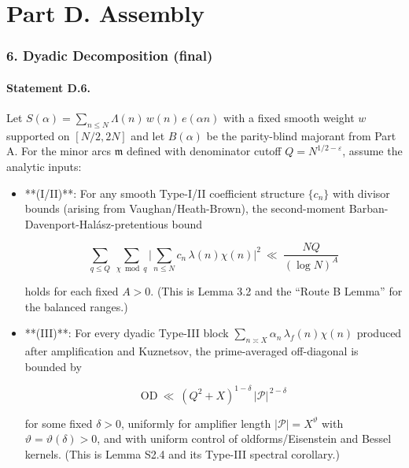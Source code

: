 \documentclass[11pt]{article}
\theoremstyle{definition}
\theoremstyle{remark}
\begin{document}
\part*{Part D. Assembly}

\section*{6. Dyadic Decomposition (final)}

\subsection*{Statement D.6.}

Let $S(\alpha)=\sum_{n\le N}\Lambda(n)\,w(n)\,e(\alpha n)$ with a fixed smooth weight $w$ supported on $[N/2,2N]$ and let $B(\alpha)$ be the parity-blind majorant from Part A. For the minor arcs $\mathfrak m$ defined with denominator cutoff $Q=N^{1/2-\varepsilon}$, assume the analytic inputs:

\begin{itemize}
\item **(I/II)**: For any smooth Type-I/II coefficient structure $\{c_n\}$ with divisor bounds (arising from Vaughan/Heath-Brown), the second-moment Barban-Davenport-Halász-pretentious bound

\begin{equation}
\sum_{q\le Q}\ \sum_{\chi\bmod q}\Big|\sum_{n\le N} c_n\,\lambda(n)\chi(n)\Big|^2
\ \ll\ \frac{NQ}{(\log N)^A}
\tag{D.1}
\end{equation}

holds for each fixed $A>0$. (This is Lemma 3.2 and the “Route B Lemma” for the balanced ranges.)

\item **(III)**: For every dyadic Type-III block $\sum_{n\asymp X}\alpha_n\,\lambda_f(n)\chi(n)$ produced after amplification and Kuznetsov, the prime-averaged off-diagonal is bounded by

\begin{equation}
\mathrm{OD}\ \ll\ (Q^2+X)^{1-\delta}\,|\mathcal P|^{\,2-\delta}
\tag{D.2}
\end{equation}

for some fixed $\delta>0$, uniformly for amplifier length $|\mathcal P|=X^\vartheta$ with $\vartheta=\vartheta(\delta)>0$, and with uniform control of oldforms/Eisenstein and Bessel kernels. (This is Lemma S2.4 and its Type-III spectral corollary.)
\end{itemize}
\end{document}
